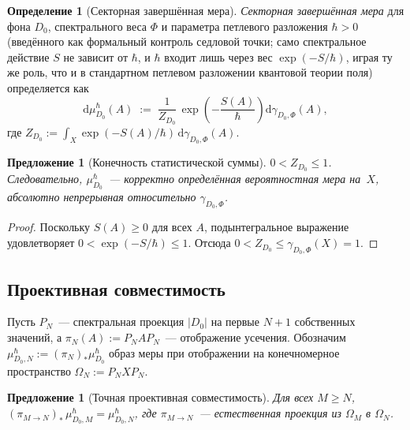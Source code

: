 \documentclass[12pt,a4paper]{article}
\theoremstyle{plain}
\newtheorem{proposition}[theorem]{Предложение}
\theoremstyle{definition}
\newtheorem{definition}[theorem]{Определение}
\theoremstyle{remark}
\newcommand{\dd}{\mathrm{d}}
\begin{document}
\begin{definition}[Секторная завершённая мера]
\label{def:completed-measure}
\emph{Секторная завершённая мера} для фона $D_0$, спектрального
веса $\Phi$ и параметра петлевого разложения $\hbar > 0$
(введённого как формальный контроль седловой точки; само спектральное
действие $S$ не зависит от $\hbar$, и $\hbar$ входит лишь через
вес $\exp(-S/\hbar)$, играя ту же роль, что и в стандартном
петлевом разложении квантовой теории поля) определяется как
\begin{equation}\label{eq:completed-measure}
  \dd\mu_{D_0}^\hbar(A)
  \;:=\;
  \frac{1}{Z_{D_0}}\,
  \exp\!\left(-\frac{S(A)}{\hbar}\right)
  \dd\gamma_{D_0,\Phi}(A),
\end{equation}
где $Z_{D_0} := \int_X \exp(-S(A)/\hbar)\,\dd\gamma_{D_0,\Phi}(A)$.
\end{definition}

\begin{proposition}[Конечность статистической суммы]
\label{prop:finite-Z}
$0 < Z_{D_0} \le 1$.  Следовательно, $\mu_{D_0}^\hbar$~--- корректно
определённая вероятностная мера на~$X$, абсолютно непрерывная
относительно $\gamma_{D_0,\Phi}$.
\end{proposition}

\begin{proof}
Поскольку $S(A) \ge 0$ для всех $A$, подынтегральное выражение
удовлетворяет $0 < \exp(-S/\hbar) \le 1$.  Отсюда
$0 < Z_{D_0} \le \gamma_{D_0,\Phi}(X) = 1$.
\end{proof}

\subsection{Проективная совместимость}

Пусть $P_N$~--- спектральная проекция $|D_0|$ на первые $N+1$
собственных значений, а $\pi_N(A) := P_N A P_N$~--- отображение
усечения.  Обозначим
$\mu_{D_0,N}^\hbar := (\pi_N)_*\mu_{D_0}^\hbar$ образ меры при
отображении на конечномерное пространство $\Omega_N := P_N X P_N$.

\begin{proposition}[Точная проективная совместимость]
\label{prop:projective}
Для всех $M \ge N$,
$(\pi_{M \to N})_*\,\mu_{D_0,M}^\hbar = \mu_{D_0,N}^\hbar$,
где $\pi_{M \to N}$~--- естественная проекция из $\Omega_M$ в
$\Omega_N$.
\end{proposition}
\end{document}
